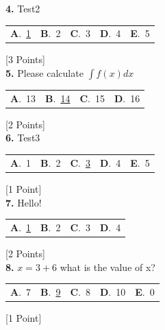 \documentclass[12pt]{article}
\newcommand{\choice}[2]{\textbf{#1}.~#2}
\begin{document}
\noindent \textbf{\textenglish{4.}} {\textenglish{Test2}}

\begin{tabularx}{\linewidth}{@{}*{5}{Y}@{}}
\choice{A}{{\underline{{\textenglish{1}}}}} & \choice{B}{{{\textenglish{2}}}} & \choice{C}{{{\textenglish{3}}}} & \choice{D}{{{\textenglish{4}}}} & \choice{E}{{{\textenglish{5}}}} \\
\end{tabularx}
\hfill {\textenglish{[3 Points]}}\\[0.5em]

\noindent \textbf{\textenglish{5.}} {\textenglish{Please calculate }}\(\int f(x)dx\)

\begin{tabularx}{\linewidth}{@{}*{4}{Y}@{}}
\choice{A}{{{\textenglish{13}}}} & \choice{B}{{\underline{{\textenglish{14}}}}} & \choice{C}{{{\textenglish{15}}}} & \choice{D}{{{\textenglish{16}}}} \\
\end{tabularx}
\hfill {\textenglish{[2 Points]}}\\[0.5em]

\noindent \textbf{\textenglish{6.}} {\textenglish{Test3}}

\begin{tabularx}{\linewidth}{@{}*{5}{Y}@{}}
\choice{A}{{{\textenglish{1}}}} & \choice{B}{{{\textenglish{2}}}} & \choice{C}{{\underline{{\textenglish{3}}}}} & \choice{D}{{{\textenglish{4}}}} & \choice{E}{{{\textenglish{5}}}} \\
\end{tabularx}
\hfill {\textenglish{[1 Point]}}\\[0.5em]

\noindent \textbf{\textenglish{7.}} {\textenglish{Hello!}}

\begin{tabularx}{\linewidth}{@{}*{4}{Y}@{}}
\choice{A}{{\underline{{\textenglish{1}}}}} & \choice{B}{{{\textenglish{2}}}} & \choice{C}{{{\textenglish{3}}}} & \choice{D}{{{\textenglish{4}}}} \\
\end{tabularx}
\hfill {\textenglish{[2 Points]}}\\[0.5em]

\noindent \textbf{\textenglish{8.}} \(x=3+6 \){\textenglish{ what is the value of x?}}

\begin{tabularx}{\linewidth}{@{}*{5}{Y}@{}}
\choice{A}{{{\textenglish{7}}}} & \choice{B}{{\underline{{\textenglish{9}}}}} & \choice{C}{{{\textenglish{8}}}} & \choice{D}{{{\textenglish{10}}}} & \choice{E}{{{\textenglish{0}}}} \\
\end{tabularx}
\hfill {\textenglish{[1 Point]}}\\[0.5em]
\end{document}
